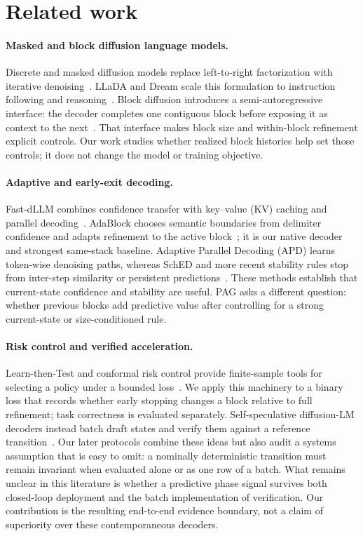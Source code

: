 \documentclass{article}
\newcommand{\pag}{PAG}
\begin{document}
\section{Related work}
\label{sec:related}

\paragraph{Masked and block diffusion language models.}
Discrete and masked diffusion models replace left-to-right factorization with iterative denoising~\citep{lou2024sedd,sahoo2024mdlm}. LLaDA and Dream scale this formulation to instruction following and reasoning~\citep{nie2025llada,ye2025dream}. Block diffusion introduces a semi-autoregressive interface: the decoder completes one contiguous block before exposing it as context to the next~\citep{arriola2025block}. That interface makes block size and within-block refinement explicit controls. Our work studies whether realized block histories help set those controls; it does not change the model or training objective.

\paragraph{Adaptive and early-exit decoding.}
Fast-dLLM combines confidence transfer with key--value (KV) caching and parallel decoding~\citep{wu2025fastdllm}. AdaBlock chooses semantic boundaries from delimiter confidence and adapts refinement to the active block~\citep{lu2026adablock}; it is our native decoder and strongest same-stack baseline. Adaptive Parallel Decoding (APD) learns token-wise denoising paths, whereas SchED and more recent stability rules stop from inter-step similarity or persistent predictions~\citep{israel2025apd,mohamed2025sched,mohamed2026less}. These methods establish that current-state confidence and stability are useful. \pag{} asks a different question: whether previous blocks add predictive value after controlling for a strong current-state or size-conditioned rule.

\paragraph{Risk control and verified acceleration.}
Learn-then-Test and conformal risk control provide finite-sample tools for selecting a policy under a bounded loss~\citep{angelopoulos2021ltt,angelopoulos2022crc}. We apply this machinery to a binary loss that records whether early stopping changes a block relative to full refinement; task correctness is evaluated separately. Self-speculative diffusion-LM decoders instead batch draft states and verify them against a reference transition~\citep{gao2025ssd,han2026s2d2}. Our later protocols combine these ideas but also audit a systems assumption that is easy to omit: a nominally deterministic transition must remain invariant when evaluated alone or as one row of a batch. What remains unclear in this literature is whether a predictive phase signal survives both closed-loop deployment and the batch implementation of verification. Our contribution is the resulting end-to-end evidence boundary, not a claim of superiority over these contemporaneous decoders.
\end{document}
